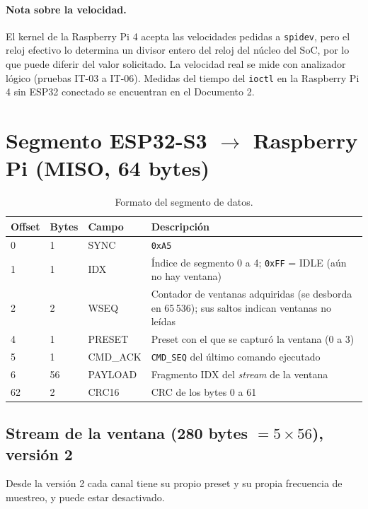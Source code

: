 \documentclass[12pt,a4paper]{article}
\begin{document}
\paragraph{Nota sobre la velocidad.} El kernel de la Raspberry Pi 4 acepta las velocidades pedidas a \texttt{spidev}, pero el reloj efectivo lo determina un divisor entero del reloj del núcleo del SoC, por lo que puede diferir del valor solicitado. La velocidad real se mide con analizador lógico (pruebas IT-03 a IT-06). Medidas del tiempo del \texttt{ioctl} en la Raspberry Pi 4 sin ESP32 conectado se encuentran en el Documento 2.

\section{Segmento ESP32-S3 $\rightarrow$ Raspberry Pi (MISO, 64 bytes)}

\begin{table}[H]
\centering
\small
\begin{tabular}{@{}p{1.5cm} p{1.4cm} p{2.4cm} p{9.2cm}@{}}
\toprule
\textbf{Offset} & \textbf{Bytes} & \textbf{Campo} & \textbf{Descripción} \\
\midrule
0  & 1  & SYNC     & \texttt{0xA5} \\
1  & 1  & IDX      & Índice de segmento 0 a 4; \texttt{0xFF} = IDLE (aún no hay ventana) \\
2  & 2  & WSEQ     & Contador de ventanas adquiridas (se desborda en 65\,536); sus saltos indican ventanas no leídas \\
4  & 1  & PRESET   & Preset con el que se capturó la ventana (0 a 3) \\
5  & 1  & CMD\_ACK & \texttt{CMD\_SEQ} del último comando ejecutado \\
6  & 56 & PAYLOAD  & Fragmento IDX del \emph{stream} de la ventana \\
62 & 2  & CRC16    & CRC de los bytes 0 a 61 \\
\bottomrule
\end{tabular}
\caption{Formato del segmento de datos.}
\end{table}

\subsection{Stream de la ventana (280 bytes $= 5 \times 56$), versión 2}

Desde la versión 2 cada canal tiene su propio preset y su propia frecuencia de muestreo, y puede estar desactivado.
\end{document}
